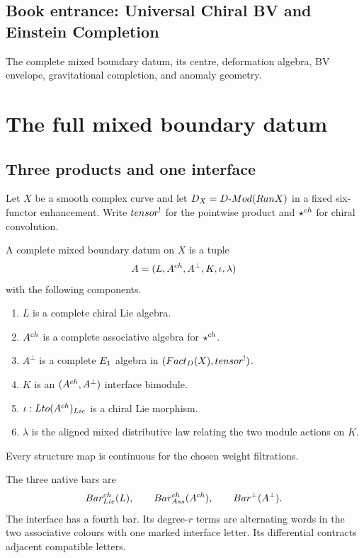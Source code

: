 \cleardoublepage
{}
{}
\chapter*{Book entrance: Universal Chiral BV and Einstein Completion}
\begin{summarybox}
The complete mixed boundary datum, its centre, deformation algebra, BV envelope, gravitational completion, and anomaly geometry.
\end{summarybox}
\part{The full mixed boundary datum}

\chapter{Three products and one interface}
Let $X$ be a smooth complex curve and let $D_X=D\text{-}Mod(Ran X)$ in a fixed six-functor enhancement.  Write $tensor^!$ for the pointwise product and $\mathbin{\star^{ch}}$ for chiral convolution.

\begin{definition}
A complete mixed boundary datum on $X$ is a tuple
\[
 A=(L,A^{ch},A^\perp,K,\iota,\lambda)
\]
with the following components.
\begin{enumerate}
\item $L$ is a complete chiral Lie algebra.
\item $A^{ch}$ is a complete associative algebra for $\mathbin{\star^{ch}}$.
\item $A^\perp$ is a complete $E_1$ algebra in $(Fact_D(X),tensor^!)$.
\item $K$ is an $(A^{ch},A^\perp)$ interface bimodule.
\item $\iota:Lto(A^{ch})_{Lie}$ is a chiral Lie morphism.
\item $\lambda$ is the aligned mixed distributive law relating the two module actions on $K$.
\end{enumerate}
Every structure map is continuous for the chosen weight filtrations.
\end{definition}

The three native bars are
\[
 Bar^{ch}_{Lie}(L),\qquad
 Bar^{ch}_{Ass}(A^{ch}),\qquad
 Bar^{\perp}(A^\perp).
\]
The interface has a fourth bar.  Its degree-$r$ terms are alternating words in the two associative colours with one marked interface letter.  Its differential contracts adjacent compatible letters.

